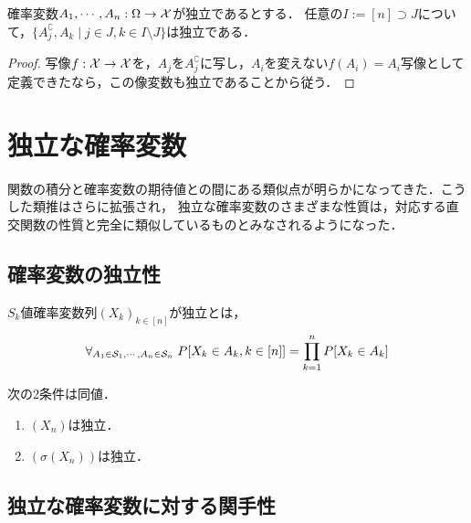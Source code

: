 \documentclass[uplatex,dvipdfmx]{jsreport}
\begin{document}
\begin{proposition}
    確率変数$A_1,\cdots,A_n:\Omega\to\mathcal{X}$が独立であるとする．
    任意の$I:=[n]\supset J$について，$\{A_j^\complement,A_k\mid j\in J,k\in I\setminus J\}$は独立である．
\end{proposition}
\begin{proof}
    写像$f:\mathcal{X}\to\mathcal{X}$を，$A_j$を$A_j^\complement$に写し，$A_i$を変えない$f(A_i)=A_i$写像として定義できたなら，この像変数も独立であることから従う．
\end{proof}

\section{独立な確率変数}

\begin{tcolorbox}[colframe=ForestGreen, colback=ForestGreen!10!white,breakable,colbacktitle=ForestGreen!40!white,coltitle=black,fonttitle=\bfseries\sffamily,
title=確率変数が独立のとき，作用素に種々の関手性が生じる]
    関数の積分と確率変数の期待値との間にある類似点が明らかになってきた．こうした類推はさらに拡張され，
    独立な確率変数のさまざまな性質は，対応する直交関数の性質と完全に類似しているものとみなされるようになった\cite{Kolmogorov}．
\end{tcolorbox}

\subsection{確率変数の独立性}

\begin{definition}
    $S_k$値確率変数列$(X_k)_{k\in[n]}$が独立とは，
    \[\forall_{A_1\in\mathcal{S}_1,\cdots,A_n\in\mathcal{S}_n}\;P[X_k\in A_k,k\in[n]]=\prod^n_{k=1}P[X_k\in A_k]\]
\end{definition}

\begin{lemma}\label{lemma-independentness-variable-and-algebra}
    次の2条件は同値．
    \begin{enumerate}
        \item $(X_n)$は独立．
        \item $(\sigma(X_n))$は独立．
    \end{enumerate}
\end{lemma}

\subsection{独立な確率変数に対する関手性}
\end{document}
